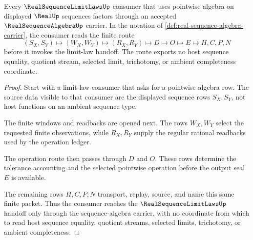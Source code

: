 \begin{theorem}\label{thm:real-sequence-algebra-limit-consumer}
Every $\RealSequenceLimitLawsUp$ consumer that uses pointwise algebra on displayed $\RealUp$ sequences factors through an accepted $\RealSequenceAlgebraUp$ carrier. In the notation of \autoref{def:real-sequence-algebra-carrier}, the consumer reads the finite route
$$
(S_X,S_Y)\longmapsto(W_X,W_Y)\longmapsto(R_X,R_Y)\longmapsto D\longmapsto O\longmapsto E\longmapsto H,C,P,N
$$
before it invokes the limit-law handoff. The route exports no host sequence equality, quotient stream, selected limit, trichotomy, or ambient completeness coordinate.
\end{theorem}
\begin{proof}
Start with a limit-law consumer that asks for a pointwise algebra row. The source data visible to that consumer are the displayed sequence rows $S_X,S_Y$, not host functions on an ambient sequence type.

The finite windows and readbacks are opened next. The rows $W_X,W_Y$ select the requested finite observations, while $R_X,R_Y$ supply the regular rational readbacks used by the operation ledger.

The operation route then passes through $D$ and $O$. These rows determine the tolerance accounting and the selected pointwise operation before the output seal $E$ is available.

The remaining rows $H,C,P,N$ transport, replay, source, and name this same finite packet. Thus the consumer reaches the $\RealSequenceLimitLawsUp$ handoff only through the sequence-algebra carrier, with no coordinate from which to read host sequence equality, quotient streams, selected limits, trichotomy, or ambient completeness.
\end{proof}

